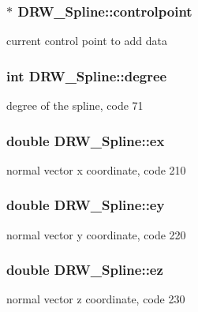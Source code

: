 \subsubsection[{controlpoint}]{$\ast$ D\+R\+W\+\_\+\+Spline\+::controlpoint\hspace{0.3cm}{\ttfamily [private]}}\label{class_d_r_w___spline_a651189169a59868278d298a9e954d093}
current control point to add data \hypertarget{class_d_r_w___spline_af60e9efc3c39f418196cca4cc9f8125b}{}
\subsubsection[{degree}]{\setlength{\rightskip}{0pt plus 5cm}int D\+R\+W\+\_\+\+Spline\+::degree}\label{class_d_r_w___spline_af60e9efc3c39f418196cca4cc9f8125b}
degree of the spline, code 71 \hypertarget{class_d_r_w___spline_a7d2455d56e3de91a85a7afd1a5b34dfe}{}
\subsubsection[{ex}]{\setlength{\rightskip}{0pt plus 5cm}double D\+R\+W\+\_\+\+Spline\+::ex}\label{class_d_r_w___spline_a7d2455d56e3de91a85a7afd1a5b34dfe}
normal vector x coordinate, code 210 \hypertarget{class_d_r_w___spline_a937a3c0c4450e383de5ebbbbc892d1ad}{}
\subsubsection[{ey}]{\setlength{\rightskip}{0pt plus 5cm}double D\+R\+W\+\_\+\+Spline\+::ey}\label{class_d_r_w___spline_a937a3c0c4450e383de5ebbbbc892d1ad}
normal vector y coordinate, code 220 \hypertarget{class_d_r_w___spline_ad3ad8a265fbc8c07bc06f8939a8a31a6}{}
\subsubsection[{ez}]{\setlength{\rightskip}{0pt plus 5cm}double D\+R\+W\+\_\+\+Spline\+::ez}\label{class_d_r_w___spline_ad3ad8a265fbc8c07bc06f8939a8a31a6}
normal vector z coordinate, code 230 \hypertarget{class_d_r_w___spline_aeefb7618b8c983a9abe32f974c8ca852}{}
